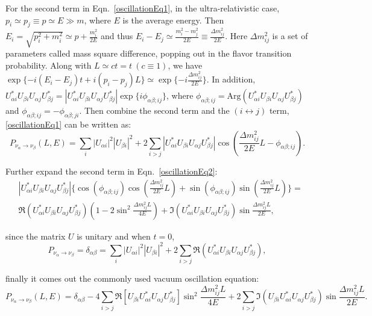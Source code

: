 For the second term in Eqn.~\ref{oscillationEq1}, in the ultra-relativistic case, $p_i\simeq p_j\equiv p\simeq E\gg m$, where $E$ is the average energy. Then $E_i=\sqrt{p^2_i+m^2_i}\simeq p+\frac{m_i^2}{2E}$ and thus $E_i-E_j\simeq \frac{m^2_i-m^2_j}{2E}\equiv \frac{\Delta m^2_{ij}}{2E}$\cite{pdg2020,aitchison2012gauge}. Here $\Delta m^2_{ij}$ is a set of parameters called mass square difference, popping out in the flavor transition probability. Along with $L\simeq ct=t~(c\equiv 1)$, we have $\exp\{-i(E_i-E_j)t+i(p_i-p_j)L\}\simeq \exp\{-i\frac{\Delta m^2_{ij}}{2E}\}$. In addition, $U^*_{\alpha i}U_{\beta i}U_{\alpha j}U^*_{\beta j}=|U^*_{\alpha i}U_{\beta i}U_{\alpha j}U^*_{\beta j}|\exp\{i\phi_{\alpha\beta;ij}\}$, where $\phi_{\alpha\beta;ij}=\mathrm{Arg}(U^*_{\alpha i}U_{\beta i}U_{\alpha j}U^*_{\beta j})$ and $\phi_{\alpha\beta;ij}=-\phi_{\alpha\beta;ji}$. Then combine the second term and the $(i\leftrightarrow j)$ term, \ref{oscillationEq1} can be written as\cite{aitchison2012gauge}:
\begin{equation}\label{oscillationEq2}
P_{\nu_\alpha\to\nu_\beta}(L,E)=
\sum_i |U_{\alpha i}|^2|U_{\beta i}|^2 + 2\sum_{i>j}|U^*_{\alpha i}U_{\beta i}U_{\alpha j}U^*_{\beta j}|\cos(\frac{\Delta m^2_{ij}}{2E}L-\phi_{\alpha\beta;ij}).
\end{equation}

Further expand the second term in Eqn.~\ref{oscillationEq2}:
\begin{equation}
 \begin{split}
&|U^*_{\alpha i}U_{\beta i}U_{\alpha j}U^*_{\beta j}|\{\cos(\phi_{\alpha\beta;ij})\cos(\frac{\Delta m^2_{ij}}{2E}L)+\sin(\phi_{\alpha\beta;ij})\sin(\frac{\Delta m^2_{ij}}{2E}L)\}=\\
&\Re(U^*_{\alpha i}U_{\beta i}U_{\alpha j}U^*_{\beta j})(1-2\sin^2\frac{\Delta m^2_{ij}L}{4E})+\Im(U^*_{\alpha i}U_{\beta i}U_{\alpha j}U^*_{\beta j})\sin\frac{\Delta m^2_{ij}L}{2E},
 \end{split}
\end{equation}

since the matrix $U$ is unitary and when $t=0$, 
\begin{equation}
P_{\nu_\alpha\to\nu_\beta}=\delta_{\alpha\beta}=\sum_i |U_{\alpha i}|^2|U_{\beta i}|^2+2\sum_{i>j}\Re(U^*_{\alpha i}U_{\beta i}U_{\alpha j}U^*_{\beta j}),
\end{equation} 

finally it comes out the commonly used vacuum oscillation equation\cite{pdg2020,aitchison2012gauge}:
\begin{equation}\label{common_oscillation}
P_{\nu_\alpha\to\nu_\beta}(L,E)=\delta_{\alpha\beta}-4\sum_{i>j} \Re[U_{\beta i}U^*_{\alpha i}U_{\alpha j}U^*_{\beta j}]\sin^2\frac{\Delta m^2_{ij}L}{4E}+2\sum_{i>j} \Im(U_{\beta i}U^*_{\alpha i}U_{\alpha j}U^*_{\beta j})\sin\frac{\Delta m^2_{ij}L}{2E}.
\end{equation}

